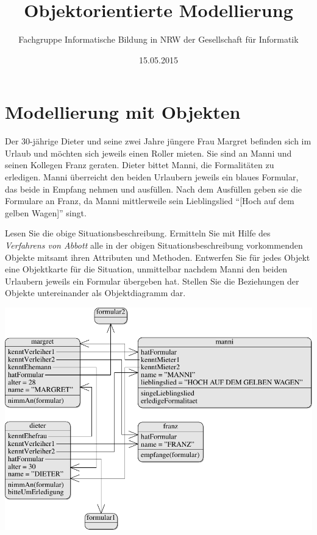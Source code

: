 \documentclass[a4paper]{scrartcl}
\author{Fachgruppe Informatische Bildung in NRW der Gesellschaft für Informatik}
\title{Objektorientierte Modellierung}
\date{15.05.2015}
\begin{document}
\section*{Modellierung mit Objekten}

\begin{aufgabe}
    Der 30-jährige Dieter und seine zwei Jahre jüngere Frau Margret befinden sich im Urlaub und möchten sich jeweils einen Roller mieten. Sie sind an Manni und seinen Kollegen Franz geraten. Dieter bittet Manni, die Formalitäten zu erledigen. Manni überreicht den beiden Urlaubern jeweils ein blaues Formular, das beide in Empfang nehmen und ausfüllen. Nach dem Ausfüllen geben sie die Formulare an Franz, da Manni mittlerweile sein Lieblingslied \enquote{[Hoch auf dem gelben Wagen]} singt.

    \begin{teilaufgaben}
        \teilaufgabe Lesen Sie die obige Situationsbeschreibung.
        \teilaufgabe[10] Ermitteln Sie mit Hilfe des \emph{Verfahrens von Abbott} alle in der obigen Situationsbeschreibung vorkommenden Objekte mitsamt ihren Attributen und Methoden.
        \teilaufgabe[10] Entwerfen Sie für jedes Objekt eine Objektkarte für die Situation, unmittelbar nachdem Manni den beiden Urlaubern jeweils ein Formular übergeben hat.
        \teilaufgabe[5] Stellen Sie die Beziehungen der Objekte untereinander als Objektdiagramm dar.
    \end{teilaufgaben}
    \begin{loesung}
        \includegraphics[scale=0.8]{aufgabe-1}
    \end{loesung}
    \begin{erwartungen}

\end{erwartungen}
\end{aufgabe}
\end{document}
